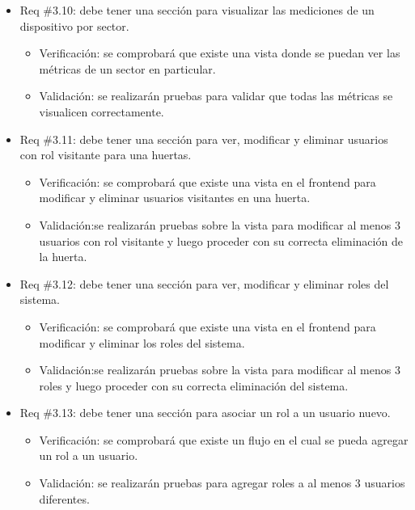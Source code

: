 \documentclass[
11pt, %
codirector, %
]{charter}
\begin{document}
\begin{itemize}
\begin{itemize}
	\item Req \#3.10: debe tener una sección para visualizar las mediciones de un dispositivo por sector.
		\begin{itemize}
		\item Verificación: se comprobará que existe una vista donde se puedan ver las métricas de un sector en particular.
		\item Validación: se realizarán pruebas para validar que todas las métricas se visualicen correctamente.\\
		\end{itemize}
		
	\item Req \#3.11: debe tener una sección para ver, modificar y eliminar usuarios con rol visitante para una huertas.
		\begin{itemize}
		\item Verificación: se comprobará que existe una vista en el frontend para modificar y eliminar usuarios visitantes en una huerta.
		\item Validación:se realizarán pruebas sobre la vista para modificar al menos 3 usuarios con rol visitante y luego proceder con su correcta eliminación de la huerta.\\
		\end{itemize}
		
	\item Req \#3.12: debe tener una sección para ver, modificar y eliminar roles del sistema.
		\begin{itemize}
		\item Verificación: se comprobará que existe una vista en el frontend para modificar y eliminar los roles del sistema.
		\item Validación:se realizarán pruebas sobre la vista para modificar al menos 3 roles y luego proceder con su correcta eliminación del sistema.\\
		\end{itemize}
		
	\item Req \#3.13: debe tener una sección para asociar un rol a un usuario nuevo.
		\begin{itemize}
		\item Verificación: se comprobará que existe un flujo en el cual se pueda agregar un rol a un usuario.
		\item Validación: se realizarán pruebas para agregar roles a al menos 3 usuarios diferentes.\\
		\end{itemize}
		

\end{itemize}
\end{itemize}
\end{document}
